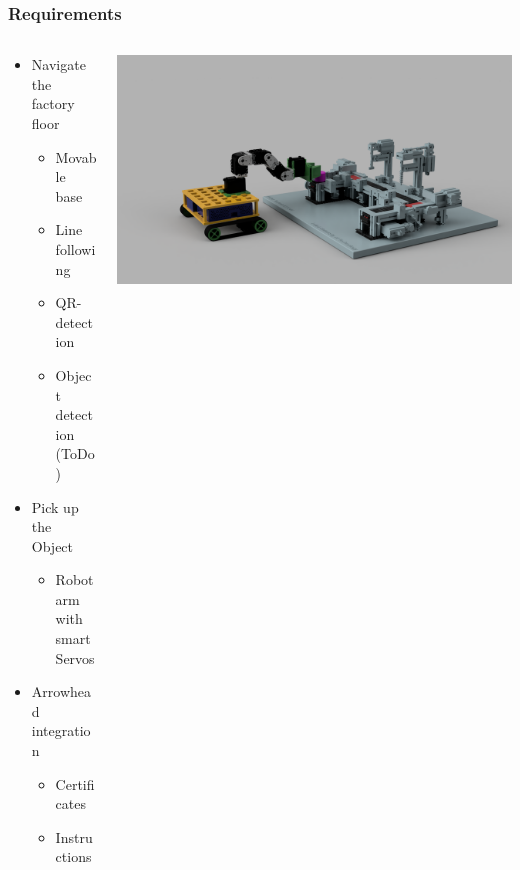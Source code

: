 \begin{frame}
    \frametitle{Requirements}

    \begin{columns}
        \begin{column}[]{0.5\textwidth}
            \begin{itemize}
                \item Navigate the factory floor
                \begin{itemize}
                    \item Movable base
                    \item Line following
                    \item QR-detection
                    \item Object detection (ToDo)
                \end{itemize}
                \item Pick up the Object
                \begin{itemize}
                    \item Robot arm with smart Servos
                \end{itemize}
                \item Arrowhead integration
                \begin{itemize}
                    \item Certificates
                    \item Instructions
                \end{itemize}
            \end{itemize}
        \end{column}

        \begin{column}[]{0.5\textwidth}
            \includegraphics[width=\textwidth]{frames/img/b4_manufacturing.PNG}
        \end{column}
    \end{columns}
    
\end{frame}